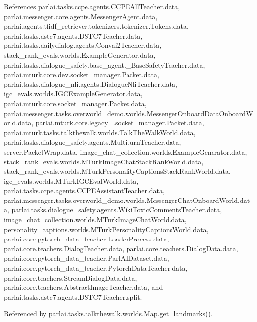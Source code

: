 References parlai.\+tasks.\+ccpe.\+agents.\+C\+C\+P\+E\+All\+Teacher.\+data, parlai.\+messenger.\+core.\+agents.\+Messenger\+Agent.\+data, parlai.\+agents.\+tfidf\+\_\+retriever.\+tokenizers.\+tokenizer.\+Tokens.\+data, parlai.\+tasks.\+dstc7.\+agents.\+D\+S\+T\+C7\+Teacher.\+data, parlai.\+tasks.\+dailydialog.\+agents.\+Convai2\+Teacher.\+data, stack\+\_\+rank\+\_\+evals.\+worlds.\+Example\+Generator.\+data, parlai.\+tasks.\+dialogue\+\_\+safety.\+base\+\_\+agent.\+\_\+\+Base\+Safety\+Teacher.\+data, parlai.\+mturk.\+core.\+dev.\+socket\+\_\+manager.\+Packet.\+data, parlai.\+tasks.\+dialogue\+\_\+nli.\+agents.\+Dialogue\+Nli\+Teacher.\+data, igc\+\_\+evals.\+worlds.\+I\+G\+C\+Example\+Generator.\+data, parlai.\+mturk.\+core.\+socket\+\_\+manager.\+Packet.\+data, parlai.\+messenger.\+tasks.\+overworld\+\_\+demo.\+worlds.\+Messenger\+Onboard\+Data\+Onboard\+World.\+data, parlai.\+mturk.\+core.\+legacy\+\_.\+socket\+\_\+manager.\+Packet.\+data, parlai.\+mturk.\+tasks.\+talkthewalk.\+worlds.\+Talk\+The\+Walk\+World.\+data, parlai.\+tasks.\+dialogue\+\_\+safety.\+agents.\+Multiturn\+Teacher.\+data, server.\+Packet\+Wrap.\+data, image\+\_\+chat\+\_\+collection.\+worlds.\+Example\+Generator.\+data, stack\+\_\+rank\+\_\+evals.\+worlds.\+M\+Turk\+Image\+Chat\+Stack\+Rank\+World.\+data, stack\+\_\+rank\+\_\+evals.\+worlds.\+M\+Turk\+Personality\+Captions\+Stack\+Rank\+World.\+data, igc\+\_\+evals.\+worlds.\+M\+Turk\+I\+G\+C\+Eval\+World.\+data, parlai.\+tasks.\+ccpe.\+agents.\+C\+C\+P\+E\+Assistant\+Teacher.\+data, parlai.\+messenger.\+tasks.\+overworld\+\_\+demo.\+worlds.\+Messenger\+Chat\+Onboard\+World.\+data, parlai.\+tasks.\+dialogue\+\_\+safety.\+agents.\+Wiki\+Toxic\+Comments\+Teacher.\+data, image\+\_\+chat\+\_\+collection.\+worlds.\+M\+Turk\+Image\+Chat\+World.\+data, personality\+\_\+captions.\+worlds.\+M\+Turk\+Personality\+Captions\+World.\+data, parlai.\+core.\+pytorch\+\_\+data\+\_\+teacher.\+Loader\+Process.\+data, parlai.\+core.\+teachers.\+Dialog\+Teacher.\+data, parlai.\+core.\+teachers.\+Dialog\+Data.\+data, parlai.\+core.\+pytorch\+\_\+data\+\_\+teacher.\+Parl\+A\+I\+Dataset.\+data, parlai.\+core.\+pytorch\+\_\+data\+\_\+teacher.\+Pytorch\+Data\+Teacher.\+data, parlai.\+core.\+teachers.\+Stream\+Dialog\+Data.\+data, parlai.\+core.\+teachers.\+Abstract\+Image\+Teacher.\+data, and parlai.\+tasks.\+dstc7.\+agents.\+D\+S\+T\+C7\+Teacher.\+split.



Referenced by parlai.\+tasks.\+talkthewalk.\+worlds.\+Map.\+get\+\_\+landmarks().

